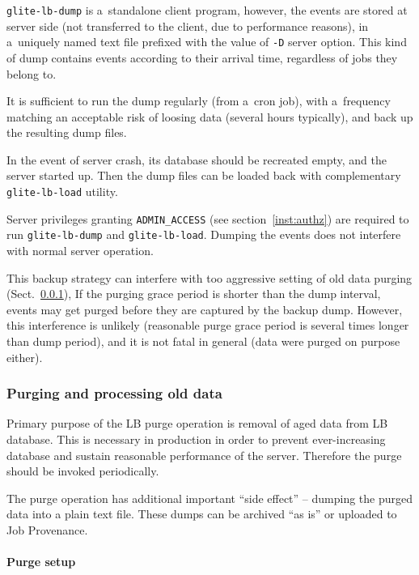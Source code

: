 \verb'glite-lb-dump' is a~standalone client program, however, 
the events are stored at server side (\ie not transferred to the client,
due to performance reasons),
in a~uniquely named text
file prefixed with the value of \verb'-D' server option. This kind of dump
contains events according to their arrival time, regardless of jobs they belong
to.

It is sufficient to run the dump regularly (from a~cron job), with a~frequency
matching an acceptable risk of loosing data (several hours typically), and back
up the resulting dump files. 

In the event of server crash, its database should be recreated empty,
and the server started up.
Then the dump files can be loaded back with complementary
\verb'glite-lb-load' utility.

Server privileges granting \verb'ADMIN_ACCESS' (see section~\ref{inst:authz}) are required to run \verb'glite-lb-dump' and \verb'glite-lb-load'.
Dumping the events does not interfere with normal server operation.

This backup strategy can interfere with too aggressive setting of old
data purging (Sect.~\ref{run:purge}), 
If the purging grace period is shorter than the dump interval,
events may get purged before they are captured by the backup dump.
However, this interference is unlikely (reasonable purge grace period
is several times longer than dump period),
and it is not fatal in general (data were purged on purpose either).

\subsubsection{Purging and processing old data}
\label{run:purge}

Primary purpose of the LB purge operation  is removal of aged data from LB database. This is necessary in
production in order to prevent ever-increasing database and sustain reasonable
performance of the server. Therefore the purge should be invoked periodically.

The purge operation has additional important ``side effect'' -- dumping the
purged data into a plain text file. These dumps can be archived ``as is'' or
uploaded to Job Provenance. 

\paragraph{Purge setup}


